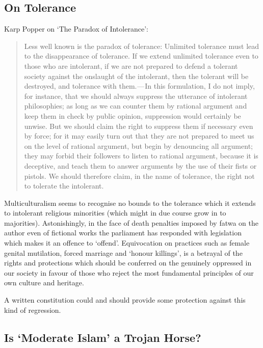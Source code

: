 \documentclass[14pt,titlepage]{extarticle}
\begin{document}
\subsection{On Tolerance}

Karp Popper on `The Paradox of Intolerance':

\begin{quote}
Less well known is the paradox of tolerance: Unlimited tolerance must lead to the disappearance of tolerance. If we extend unlimited tolerance even to those who are intolerant, if we are not prepared to defend a tolerant society against the onslaught of the intolerant, then the tolerant will be destroyed, and tolerance with them. — In this formulation, I do not imply, for instance, that we should always suppress the utterance of intolerant philosophies; as long as we can counter them by rational argument and keep them in check by public opinion, suppression would certainly be unwise. But we should claim the right to suppress them if necessary even by force; for it may easily turn out that they are not prepared to meet us on the level of rational argument, but begin by denouncing all argument; they may forbid their followers to listen to rational argument, because it is deceptive, and teach them to answer arguments by the use of their fists or pistols. We should therefore claim, in the name of tolerance, the right not to tolerate the intolerant.
\end{quote}

Multiculturalism seems to recognise no bounds to the tolerance which it extends to intolerant religious minorities (which might in due course grow in to majorities).
Astonishingly, in the face of death penalties imposed by fatwa on the author even of fictional works the parliament has responded with legislation which makes it an offence to `offend'.
Equivocation on practices such as female genital mutilation, forced marriage and `honour killings', is a betrayal of the rights and protections which should be conferred on the genuinely oppressed in our society in favour of those who reject the most fundamental principles of our own culture and heritage.

A written constitution could and should provide some protection against this kind of regression.

\subsection{Is `Moderate Islam' a Trojan Horse?}
\end{document}
